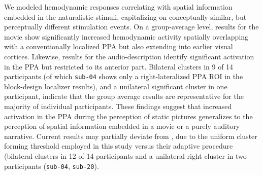 \documentclass[english,11pt]{article}
\begin{document}
We modeled hemodynamic responses correlating with spatial information embedded
in the naturalistic stimuli, capitalizing on conceptually similar, but
perceptually different stimulation events.
On a group-average level, results for the movie show significantly
increased hemodynamic activity spatially overlapping with a conventionally
localized PPA but also extending into earlier visual cortices.
Likewise, results for the audio-description identify significant activation in
the PPA but restricted to its anterior part.
Bilateral clusters in 9 of 14
participants (of which \texttt{sub-04} shows only a right-lateralized PPA ROI
in the block-design localizer results), and a unilateral
significant cluster in one participant, indicate that the group average results
are representative for the majority of individual participants.
These findings suggest that increased activation in the PPA during the
perception of static pictures generalizes to the perception of spatial
information embedded in a movie or a purely auditory narrative.
%
Current results may partially deviate from \citet{sengupta2016extension}, due to
the uniform cluster forming threshold employed in this study versus their
adaptive procedure (bilateral clusters in 12 of 14 participants and a unilateral
right cluster in two participants (\texttt{sub-04}, \texttt{sub-20}).
\end{document}
